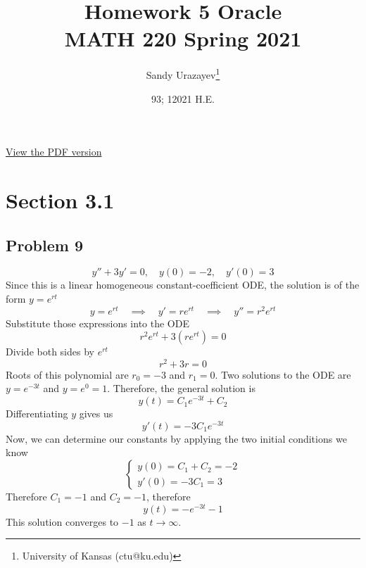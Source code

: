 \documentclass[12pt]{article}
\author{Sandy Urazayev\thanks{University of Kansas (ctu@ku.edu)}}
\date{93; 12021 H.E.}
\title{Homework 5 Oracle\\\medskip
\large MATH 220 Spring 2021}
\begin{document}
\maketitle
\href{./index.pdf}{View the PDF version​}

\section*{Section 3.1}
\label{sec:orgbc11b5a}
\subsection*{Problem 9}
\label{sec:orgf50ec0a}
\begin{equation*}
  y'' + 3y' = 0, \quad y(0) = -2, \quad y'(0) = 3
\end{equation*}
Since this is a linear homogeneous constant-coefficient ODE, the solution is
of the form \(y = e^{rt}\)
\begin{equation*}
  y=e^{rt} \quad \implies \quad y' = re^{rt} \quad \implies \quad y'' = r^2 e^{rt}
\end{equation*}
Substitute those expressions into the ODE
\begin{equation*}
  r^2 e^{rt} + 3(re^{rt}) = 0
\end{equation*}
Divide both sides by \(e^{rt}\)
\begin{equation*}
  r^2 + 3r = 0
\end{equation*}
Roots of this polynomial are \(r_0 = -3\) and \(r_1 = 0\). Two solutions to the
ODE are \(y=e^{-3t}\) and \(y=e^0=1\). Therefore, the general solution is
\begin{equation*}
  y(t) = C_1 e^{-3t} + C_2
\end{equation*}
Differentiating \(y\) gives us
\begin{equation*}
  y'(t) = -3C_1 e^{-3t}
\end{equation*}
Now, we can determine our constants by applying the two initial conditions we
know
\begin{equation*}
  \begin{cases}
    y(0) = C_1 + C_2 = -2\\
    y'(0) = -3C_1 = 3
  \end{cases}
\end{equation*}
Therefore \(C_1 = -1\) and \(C_2 = -1\), therefore
\begin{equation*}
  y(t) = -e^{-3t} - 1
\end{equation*}
This solution converges to \(-1\) as \(t \to \infty\).
\end{document}
